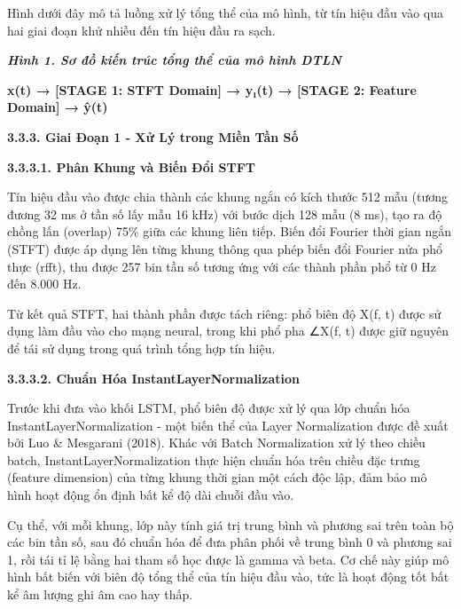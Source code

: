 \documentclass[
  13pt,
]{article}
\begin{document}
Hình dưới đây mô tả luồng xử lý tổng thể của mô hình, từ tín hiệu đầu
vào qua hai giai đoạn khử nhiễu đến tín hiệu đầu ra sạch.

\textbf{\emph{Hình 1. Sơ đồ kiến trúc tổng thể của mô hình DTLN}}

\textbf{x(t) → {[}STAGE 1: STFT Domain{]} → y₁(t) → {[}STAGE 2: Feature
Domain{]} → ŷ(t)}

\textbf{3.3.3. Giai Đoạn 1 - Xử Lý trong Miền Tần Số}

\textbf{3.3.3.1. Phân Khung và Biến Đổi STFT}

Tín hiệu đầu vào được chia thành các khung ngắn có kích thước 512 mẫu
(tương đương 32 ms ở tần số lấy mẫu 16 kHz) với bước dịch 128 mẫu (8
ms), tạo ra độ chồng lấn (overlap) 75\% giữa các khung liên tiếp. Biến
đổi Fourier thời gian ngắn (STFT) được áp dụng lên từng khung thông qua
phép biến đổi Fourier nửa phổ thực (rfft), thu được 257 bin tần số tương
ứng với các thành phần phổ từ 0 Hz đến 8.000 Hz.

Từ kết quả STFT, hai thành phần được tách riêng: phổ biên độ
\textbar X(f, t)\textbar{} được sử dụng làm đầu vào cho mạng neural,
trong khi phổ pha ∠X(f, t) được giữ nguyên để tái sử dụng trong quá
trình tổng hợp tín hiệu.

\textbf{3.3.3.2. Chuẩn Hóa InstantLayerNormalization}

Trước khi đưa vào khối LSTM, phổ biên độ được xử lý qua lớp chuẩn hóa
InstantLayerNormalization - một biến thể của Layer Normalization được đề
xuất bởi Luo \& Mesgarani (2018). Khác với Batch Normalization xử lý
theo chiều batch, InstantLayerNormalization thực hiện chuẩn hóa trên
chiều đặc trưng (feature dimension) của từng khung thời gian một cách
độc lập, đảm bảo mô hình hoạt động ổn định bất kể độ dài chuỗi đầu vào.

Cụ thể, với mỗi khung, lớp này tính giá trị trung bình và phương sai
trên toàn bộ các bin tần số, sau đó chuẩn hóa để đưa phân phối về trung
bình 0 và phương sai 1, rồi tái tỉ lệ bằng hai tham số học được là gamma
và beta. Cơ chế này giúp mô hình bất biến với biên độ tổng thể của tín
hiệu đầu vào, tức là hoạt động tốt bất kể âm lượng ghi âm cao hay thấp.
\end{document}
